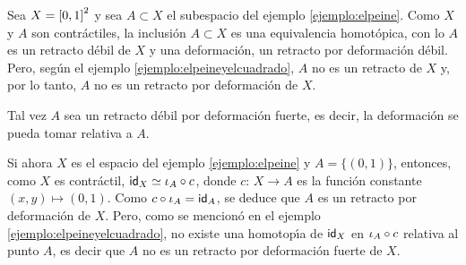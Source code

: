 \begin{ejemploElPeineYElCuadradoNoEsRetracto}%
	\label{ejemplo:elpeineyelcuadradonoesretracto}
	Sea $X=\intervalo^{2}$ y sea $A\subset X$ el subespacio del ejemplo
	\ref{ejemplo:elpeine}. Como $X$ y $A$ son contr\'{a}ctiles, la
	inclusi\'{o}n $A\subset X$ es una equivalencia homot\'{o}pica, con lo
	$A$ es un retracto d\'{e}bil de $X$ y una deformaci\'{o}n,
	un retracto por deformaci\'{o}n d\'{e}bil. Pero, seg\'{u}n el ejemplo
	\ref{ejemplo:elpeineyelcuadrado}, $A$ no es un retracto de $X$ y, por
	lo tanto, $A$ no es un retracto por deformaci\'{o}n de $X$.

	Tal vez $A$ sea un retracto d\'{e}bil por deformaci\'{o}n fuerte, es
	decir, la deformaci\'{o}n se pueda tomar relativa a $A$.
\end{ejemploElPeineYElCuadradoNoEsRetracto}

\begin{ejemploElPuntoYElPeine}\label{ejemplo:elpuntoyelpeine}
	Si ahora $X$ es el espacio del ejemplo \ref{ejemplo:elpeine} y
	$A=\{(0,1)\}$, entonces, como $X$ es contr\'{a}ctil,
	$\id[X]\simeq\inc[A]\circ c$, donde $c:\,X\rightarrow A$ es la
	funci\'{o}n constante $(x,y)\mapsto (0,1)$. Como
	$c\circ\inc[A]=\id[A]$, se deduce que $A$ es un retracto por
	deformaci\'{o}n de $X$. Pero, como se mencion\'{o} en el ejemplo
	\ref{ejemplo:elpeineyelcuadrado}, no existe una homotop\'{\i}a
	de $\id[X]$ en $\inc[A]\circ c$ relativa al punto $A$, es decir que
	$A$ no es un retracto por deformaci\'{o}n fuerte de $X$.
\end{ejemploElPuntoYElPeine}
